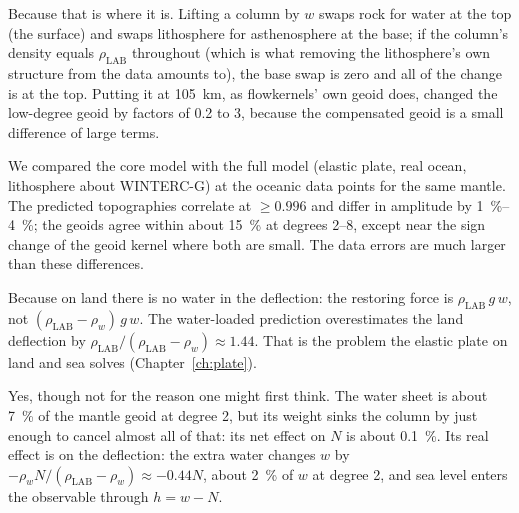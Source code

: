 \begin{defence}
\A Because that is where it is.
Lifting a column by $w$ swaps rock for water at the top (the surface) and swaps lithosphere for asthenosphere at the base; if the column's density equals $\rho_{\mathrm{LAB}}$ throughout (which is what removing the lithosphere's own structure from the data amounts to), the base swap is zero and all of the change is at the top.
Putting it at \qty{105}{km}, as flowkernels' own geoid does, changed the low-degree geoid by factors of 0.2 to 3, because the compensated geoid is a small difference of large terms.

\A We compared the core model with the full model (elastic plate, real ocean, lithosphere about WINTERC-G) at the oceanic data points for the same mantle.
The predicted topographies correlate at $\ge 0.996$ and differ in amplitude by \qtyrange{1}{4}{\percent}; the geoids agree within about \qty{15}{\percent} at degrees 2--8, except near the sign change of the geoid kernel where both are small.
The data errors are much larger than these differences.

\A Because on land there is no water in the deflection: the restoring force is $\rho_{\mathrm{LAB}}\,g\,w$, not $(\rho_{\mathrm{LAB}}-\rho_w)\,g\,w$.
The water-loaded prediction overestimates the land deflection by $\rho_{\mathrm{LAB}}/(\rho_{\mathrm{LAB}}-\rho_w)\approx 1.44$.
That is the problem the elastic plate on land and sea solves (Chapter~\ref{ch:plate}).

\A Yes, though not for the reason one might first think.
The water sheet is about \qty{7}{\percent} of the mantle geoid at degree 2, but its weight sinks the column by just enough to cancel almost all of that: its net effect on $N$ is about \qty{0.1}{\percent}.
Its real effect is on the deflection: the extra water changes $w$ by $-\rho_w N/(\rho_{\mathrm{LAB}}-\rho_w)\approx -0.44N$, about \qty{2}{\percent} of $w$ at degree 2, and sea level enters the observable through $h=w-N$.
\end{defence}

